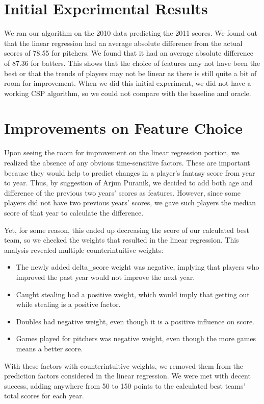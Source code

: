 \documentclass[12pt]{amsart}
\begin{document}
\section{\large Initial Experimental Results}
We ran our algorithm on the 2010 data predicting the 2011 scores. We found out that the linear regression had an average absolute difference from the actual scores of 78.55 for pitchers. We found that it had an average absolute difference of 87.36 for batters. This shows that the choice of features may not have been the best or that the trends of players may not be linear as there is still quite a bit of room for improvement. When we did this initial experiment, we did not have a working CSP algorithm, so we could not compare with the baseline and oracle.

\section{\large Improvements on Feature Choice}
Upon seeing the room for improvement on the linear regression portion, we realized the absence of any obvious time-sensitive factors. These are important because they would help to predict changes in a player's fantasy score from year to year. Thus, by suggestion of Arjun Puranik, we decided to add both age and difference of the previous two years' scores as features. However, since some players did not have two previous years' scores, we gave such players the median score of that year to calculate the difference. 
\vspace{.4cm}

Yet, for some reason, this ended up decreasing the score of our calculated best team, so we checked the weights that resulted in the linear regression. This analysis revealed multiple counterintuitive weights:
\begin{itemize}
	\item The newly added delta\_score weight was negative, implying that players who improved the past year would not improve the next year. \\
	\item Caught stealing had a positive weight, which would imply that getting out while stealing is a positive factor. \\
	\item Doubles had negative weight, even though it is a positive influence on score.\\
	\item Games played for pitchers was negative weight, even though the more games means a better score.
\end{itemize}
With these factors with counterintuitive weights, we removed them from the prediction factors considered in the linear regression. We were met with decent success, adding anywhere from 50 to 150 points to the calculated best teams' total scores for each year.
\end{document}
